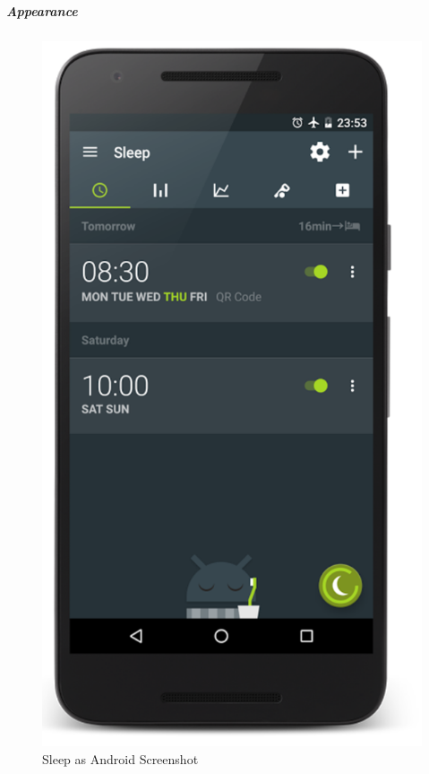 \subparagraph{Appearance}\label{appearance}

\begin{figure}[h]
  \begin{center}
    \includegraphics[scale=0.4,keepaspectratio]{Images/sleepas.png}
    \caption{Sleep as Android Screenshot}
  \end{center}
\end{figure}

